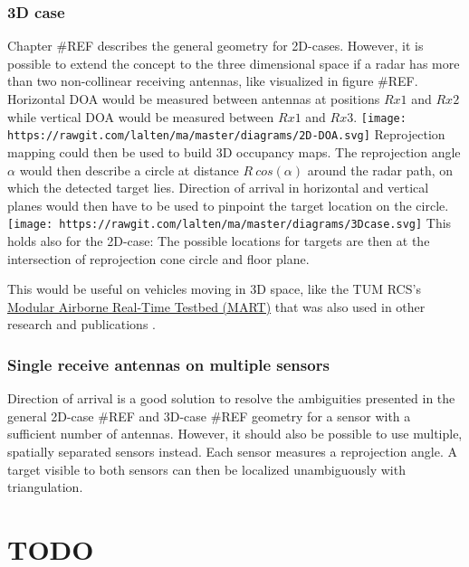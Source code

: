 \subsubsection{3D case}\label{d-case}

Chapter \#REF describes the general geometry for 2D-cases. However, it
is possible to extend the concept to the three dimensional space if a
radar has more than two non-collinear receiving antennas, like
visualized in figure \#REF. Horizontal DOA would be measured between
antennas at positions \(Rx1\) and \(Rx2\) while vertical DOA would be
measured between \(Rx1\) and \(Rx3\).
\texttt{[image: https://rawgit.com/lalten/ma/master/diagrams/2D-DOA.svg]}
Reprojection mapping could then be used to build 3D occupancy maps. The
reprojection angle \(\alpha\) would then describe a circle at distance
\(R~cos(\alpha)\) around the radar path, on which the detected target
lies. Direction of arrival in horizontal and vertical planes would then
have to be used to pinpoint the target location on the circle.
\texttt{[image: https://rawgit.com/lalten/ma/master/diagrams/3Dcase.svg]}
This holds also for the 2D-case: The possible locations for targets are
then at the intersection of reprojection cone circle and floor plane.

This would be useful on vehicles moving in 3D space, like the TUM RCS's
\href{https://www.rcs.ei.tum.de/forschung/mart/}{Modular Airborne
Real-Time Testbed (MART)} that was also used in other research and
publications \cite{Becker2015}.

\subsubsection{Single receive antennas on multiple
sensors}\label{single-receive-antennas-on-multiple-sensors}

Direction of arrival is a good solution to resolve the ambiguities
presented in the general 2D-case \#REF and 3D-case \#REF geometry for a
sensor with a sufficient number of antennas. However, it should also be
possible to use multiple, spatially separated sensors instead. Each
sensor measures a reprojection angle. A target visible to both sensors
can then be localized unambiguously with triangulation.

\section{TODO}\label{todo-3}

